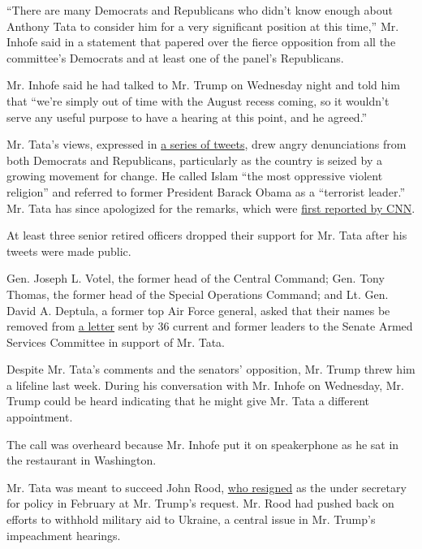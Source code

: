 ``There are many Democrats and Republicans who didn't know enough about
Anthony Tata to consider him for a very significant position at this
time,'' Mr. Inhofe said in a statement that papered over the fierce
opposition from all the committee's Democrats and at least one of the
panel's Republicans.

Mr. Inhofe said he had talked to Mr. Trump on Wednesday night and told
him that ``we're simply out of time with the August recess coming, so it
wouldn't serve any useful purpose to have a hearing at this point, and
he agreed.''

Mr. Tata's views, expressed in
\href{https://twitter.com/ajtata/status/1014278134185840640}{a series of
tweets}, drew angry denunciations from both Democrats and Republicans,
particularly as the country is seized by a growing movement for change.
He called Islam ``the most oppressive violent religion'' and referred to
former President Barack Obama as a ``terrorist leader.'' Mr. Tata has
since apologized for the remarks, which were
\href{https://edition.cnn.com/2020/06/12/politics/pentagon-nominee-tata-trump-kfile/index.html}{first
reported by CNN}.

At least three senior retired officers dropped their support for Mr.
Tata after his tweets were made public.

Gen. Joseph L. Votel, the former head of the Central Command; Gen. Tony
Thomas, the former head of the Special Operations Command; and Lt. Gen.
David A. Deptula, a former top Air Force general, asked that their names
be removed from
\href{https://s.wsj.net/public/resources/documents/Tata-Letter_06-18-2020.pdf}{a
letter} sent by 36 current and former leaders to the Senate Armed
Services Committee in support of Mr. Tata.

Despite Mr. Tata's comments and the senators' opposition, Mr. Trump
threw him a lifeline last week. During his conversation with Mr. Inhofe
on Wednesday, Mr. Trump could be heard indicating that he might give Mr.
Tata a different appointment.

The call was overheard because Mr. Inhofe put it on speakerphone as he
sat in the restaurant in Washington.

Mr. Tata was meant to succeed John Rood,
\href{https://www.nytimes3xbfgragh.onion/2020/02/19/us/politics/john-rood-trump.html}{who
resigned} as the under secretary for policy in February at Mr. Trump's
request. Mr. Rood had pushed back on efforts to withhold military aid to
Ukraine, a central issue in Mr. Trump's impeachment hearings.


